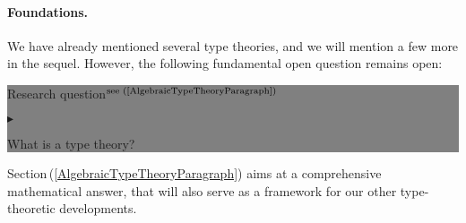 \documentclass[11pt,twocolumn]{article}
\newenvironment{btritemize}
  {\begin{list}{\btr}
  {\setlength{\topsep}{2pt}
   \setlength{\partopsep}{2pt}
   \setlength{\itemsep}{2.5pt}
   \setlength{\parsep}{2.5pt}
   \setlength{\leftmargin}{1em}
   \setlength{\labelwidth}{.5em}}}
  {\end{list}}
\newcommand{\mytextsf}[1]{\textsf{\small #1}}
\newcommand{\hide}[1]{}
\newcommand{\pref}[1]{\,(\ref{#1})}
\newcommand{\btr}{$\blacktriangleright$}
\newcommand{\reqpsize}{8.113395cm}%
\newcommand{\req}[2]{\begin{center}\colorbox{grey}{\begin{minipage}{\reqpsize} 
  \mytextsf{Research question}\hfill$^{\mbox{\scriptsize see #1 }}$\\[-5.5mm]
  \begin{btritemize}
  \item #2
  \end{btritemize}
\end{minipage}}\end{center}}
\begin{document}
\setcounter{paragraph}{0}
\paragraph{Foundations.}

We have already mentioned several type theories, and we will mention a few
more in the sequel.  However, the following fundamental open question
remains open:
\req{(\ref{AlgebraicTypeTheoryParagraph})}
{What is a type theory?}

Section\pref{AlgebraicTypeTheoryParagraph} aims at a comprehensive
mathematical answer, that will also serve as a framework for our other
type-theoretic developments.  
\hide{
  We regard this as a step towards the related open question:
\req{}{What is a programming language?}
that will be kept in the background of our investigations.
}
\end{document}
